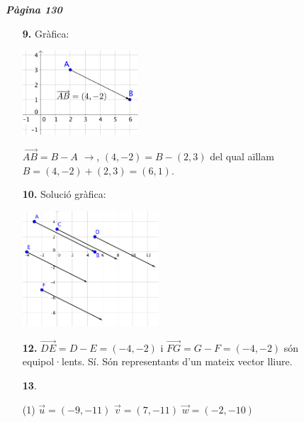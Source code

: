 \documentclass[a4paper, pdf, twoside]{book}
\begin{document}
\begin{multicols}{2}

{\textbf{\em Pàgina 130}} \hrulefill
\begin{enumerate}
\vspace{0.25cm}
\item[\fontfamily{phv}\selectfont\color{blue}\textbf{9. }] 
Gràfica:\par \includegraphics [width=0.34\textwidth ]{img-sol/t10-9}\par $\overrightarrow {AB}=B-A$ $\rightarrow $, $(4,-2)=B-(2,3)$ del qual aïllam $B=(4,-2)+(2,3)=(6,1)$.
 \end{enumerate}
\begin{enumerate}
\vspace{0.25cm}
\item[\fontfamily{phv}\selectfont\color{blue}\textbf{10. }] 
Solució gràfica:\par \includegraphics [width=0.4\textwidth ]{img-sol/t10-equipolent}
\vspace{0.25cm}
\item[\fontfamily{phv}\selectfont\color{blue}\textbf{12. }] 
$\overrightarrow {DE}=D-E=(-4,-2)$ i $\overrightarrow {FG}=G-F=(-4,-2)$ són equipol·lents. Sí. Són representants d'un mateix vector lliure.
\vspace{0.25cm}



 \item[\fontfamily{phv}\selectfont\color{blue}\textbf{13}. ] 
 \begin{tasks}[column-sep=1em, item-indent=1.3333em](1)
	 \task $\vec u = (-9,-11)$
	 \task $\vec v=(7,-11)$
	 \task $\vec w=(-2,-10)$
\end{tasks}
\vspace{0.25cm}



\end{enumerate}
\end{multicols}
\end{document}
